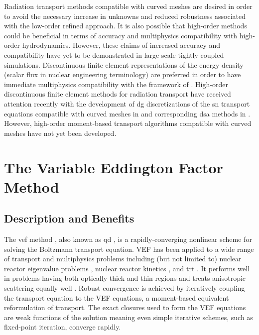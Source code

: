 \documentclass[../doc.tex]{subfiles}
\begin{document}
Radiation transport methods compatible with curved meshes are desired in order to avoid the necessary increase in unknowns and reduced robustness associated with the low-order refined approach. It is also possible that high-order methods could be beneficial in terms of accuracy and multiphysics compatibility with high-order hydrodynamics. However, these claims of increased accuracy and compatibility have yet to be demonstrated in large-scale tightly coupled simulations. Discontinuous finite element representations of the energy density (scalar flux in nuclear engineering terminology) are preferred in order to have immediate multiphysics compatibility with the framework of \cite{blast}. High-order discontinuous finite element methods for radiation transport have received attention recently with the development of \gls{dg} discretizations of the \gls{sn} transport equations compatible with curved meshes in \cite{graph_sweeps,woods_thesis} and corresponding \gls{dsa} methods in \cite{ldrd_dsa,doi:10.1080/00295639.2020.1799603}. 
However, high-order moment-based transport algorithms compatible with curved meshes have not yet been developed. 

\section{The Variable Eddington Factor Method}
\subsection{Description and Benefits}
The \gls{vef} method \cite{mihalas}, also known as \gls{qd} \cite{goldin}, is a rapidly-converging nonlinear scheme for solving the Boltzmann transport equation. VEF has been applied to a wide range of transport and multiphysics problems including (but not limited to) nuclear reactor eigenvalue problems \cite{airstova_eigenvalue}, nuclear reactor kinetics \cite{doi:10.13182/NSE13-42}, and \gls{trt} \cite{anistratov1996nonlinear}. It performs well in problems having both optically thick and thin regions and treats anisotropic scattering equally well \cite{anistratov_fvm,ARISTOVA2000139}. Robust convergence is achieved by iteratively coupling the transport equation to the VEF equations, a moment-based equivalent reformulation of transport. The exact closures used to form the VEF equations are weak functions of the solution meaning even simple iterative schemes, such as fixed-point iteration, converge rapidly. 
\end{document}
